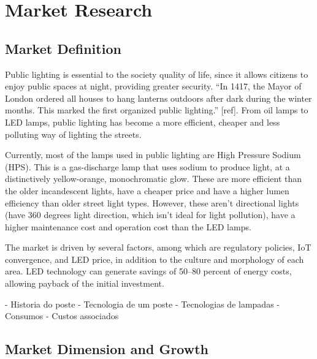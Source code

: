 \section{Market Research}
\subsection{Market Definition}
Public lighting is essential to the society quality of life, since it allows citizens to enjoy public spaces at night, providing greater security. “In 1417, the Mayor of London ordered all houses to hang lanterns outdoors after dark during the winter months. This marked the first organized public lighting.” [ref]. From oil lamps to LED lamps, public lighting has become a more efficient, cheaper and less polluting way of lighting the streets. 

Currently, most of the lamps used in public lighting are High Pressure Sodium (HPS). This is a gas-discharge lamp that uses sodium to produce light, at a distinctively yellow-orange, monochromatic glow. These are more efficient than the older incandescent lights, have a cheaper price and have a higher lumen efficiency than older street light types. However, these aren’t directional lights (have 360 degrees light direction, which isn't ideal for light pollution), have a higher maintenance cost and operation cost than the LED lamps. 

The market is driven by several factors, among which are regulatory policies, IoT convergence, and LED price, in addition to the culture and morphology of each area. LED technology can generate savings of 50–80 percent of energy costs, allowing payback of the initial investment.


- Historia do poste
	- Tecnologia de um poste
- Tecnologias de lampadas
- Consumos
- Custos associados


\subsection{Market Dimension and Growth}
